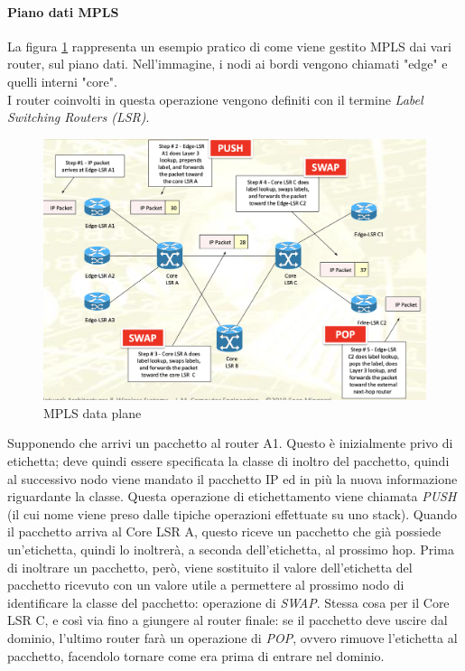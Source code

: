 \documentclass{article}
\begin{document}
\paragraph{Piano dati MPLS} La figura \ref{figura:dati-mpls} rappresenta un esempio pratico di come viene gestito MPLS dai vari router, sul piano dati. Nell'immagine, i nodi ai bordi vengono chiamati "edge" e quelli interni "core". \\ I router coinvolti in questa operazione vengono definiti con il termine \textit{Label Switching Routers (LSR)}. 
\begin{figure}[H]
    \centering
    \includegraphics[scale=0.4]{figures/mpls data plane.png}
    \caption{MPLS data plane}\label{figura:dati-mpls}
\end{figure}
Supponendo che arrivi un pacchetto al router A1. Questo è inizialmente privo di etichetta; deve quindi essere specificata la classe di inoltro del pacchetto, quindi al successivo nodo viene mandato il pacchetto IP ed in più la nuova informazione riguardante la classe. Questa operazione di etichettamento viene chiamata \textit{PUSH} (il cui nome viene preso dalle tipiche operazioni effettuate su uno stack). Quando il pacchetto arriva al Core LSR A, questo riceve un pacchetto che già possiede un'etichetta, quindi lo inoltrerà, a seconda dell'etichetta, al prossimo hop. Prima di inoltrare un pacchetto, però, viene sostituito il valore dell'etichetta del pacchetto ricevuto con un valore utile a permettere al prossimo nodo di identificare la classe del pacchetto: operazione di \textit{SWAP}. Stessa cosa per il Core LSR C, e così via fino a giungere al router finale: se il pacchetto deve uscire dal dominio, l'ultimo router farà un operazione di \textit{POP}, ovvero rimuove l'etichetta al pacchetto, facendolo tornare come era prima di entrare nel dominio.
\end{document}
